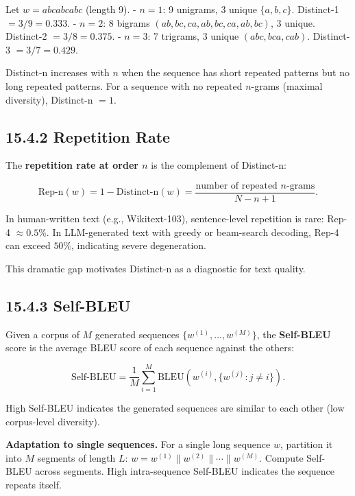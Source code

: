 \begin{example}
Let $w = abcabcabc$ (length 9).
- $n = 1$: 9 unigrams, 3 unique $\{a, b, c\}$. Distinct-1 $= 3/9 = 0.333$.
- $n = 2$: 8 bigrams $(ab, bc, ca, ab, bc, ca, ab, bc)$, 3 unique. Distinct-2 $= 3/8 = 0.375$.
- $n = 3$: 7 trigrams, 3 unique $(abc, bca, cab)$. Distinct-3 $= 3/7 = 0.429$.
\end{example}

\begin{remark}
Distinct-n increases with $n$ when the sequence has short repeated patterns but no long repeated patterns. For a sequence with no repeated $n$-grams (maximal diversity), Distinct-n $= 1$.
\end{remark}

\subsection{15.4.2 Repetition Rate}

\begin{definition}[Rep-n]
The \textbf{repetition rate at order $n$} is the complement of Distinct-n:

\[\mathrm{Rep\text{-}n}(w) = 1 - \mathrm{Distinct\text{-}n}(w) = \frac{\text{number of repeated } n\text{-grams}}{N - n + 1}.\]
\end{definition}

\begin{theorem}[Welleck et al., 2020]
In human-written text (e.g., Wikitext-103), sentence-level repetition is rare: Rep-4 $\approx 0.5\%$. In LLM-generated text with greedy or beam-search decoding, Rep-4 can exceed $50\%$, indicating severe degeneration.

This dramatic gap motivates Distinct-n as a diagnostic for text quality.
\end{theorem}

\subsection{15.4.3 Self-BLEU}

\begin{definition}
Given a corpus of $M$ generated sequences $\{w^{(1)}, \ldots, w^{(M)}\}$, the \textbf{Self-BLEU} score is the average BLEU score of each sequence against the others:

\[\mathrm{Self\text{-}BLEU} = \frac{1}{M} \sum_{i=1}^{M} \mathrm{BLEU}(w^{(i)}, \{w^{(j)} : j \neq i\}).\]

High Self-BLEU indicates the generated sequences are similar to each other (low corpus-level diversity).

\textbf{Adaptation to single sequences.} For a single long sequence $w$, partition it into $M$ segments of length $L$: $w = w^{(1)} \| w^{(2)} \| \cdots \| w^{(M)}$. Compute Self-BLEU across segments. High intra-sequence Self-BLEU indicates the sequence repeats itself.
\end{definition}



